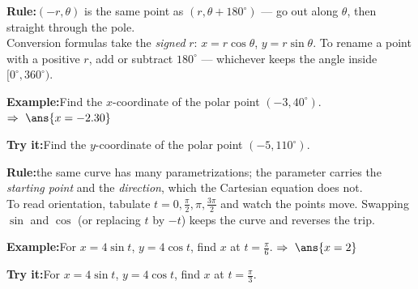 \documentclass[12pt]{article}
\begin{document}
\begin{formulabox}\textbf{Rule:}\quad $(-r, \theta)$ is the same point as
$(r, \theta + 180^\circ)$ --- go out along $\theta$, then straight through the pole.\\[3pt]
Conversion formulas take the \emph{signed} $r$: $x = r\cos\theta$, $y = r\sin\theta$.
To rename a point with a positive $r$, add or subtract $180^\circ$ --- whichever keeps the angle
inside $[0^\circ, 360^\circ)$.
\end{formulabox}
\begin{examplebox}\textbf{Example:}\quad Find the $x$-coordinate of the polar point
$(-3, 40^\circ)$.
$\Rightarrow\ \ans{x = -2.30}$
\end{examplebox}
\begin{tryitbox}\textbf{Try it:}\quad Find the $y$-coordinate of the polar point
$(-5, 110^\circ)$.\\[2pt]
\end{tryitbox}

\begin{formulabox}\textbf{Rule:}\quad the same curve has many parametrizations; the parameter
carries the \emph{starting point} and the \emph{direction}, which the Cartesian equation does not.
\\[3pt]
To read orientation, tabulate $t = 0, \frac{\pi}{2}, \pi, \frac{3\pi}{2}$ and watch the points
move. Swapping $\sin$ and $\cos$ (or replacing $t$ by $-t$) keeps the curve and reverses the trip.
\end{formulabox}
\begin{examplebox}\textbf{Example:}\quad For $x = 4\sin t$, $y = 4\cos t$, find $x$ at
$t = \frac{\pi}{6}$.
$\Rightarrow\ \ans{x = 2}$
\end{examplebox}
\begin{tryitbox}\textbf{Try it:}\quad For $x = 4\sin t$, $y = 4\cos t$, find $x$ at
$t = \frac{\pi}{3}$.\\[2pt]
\end{tryitbox}
\end{document}
